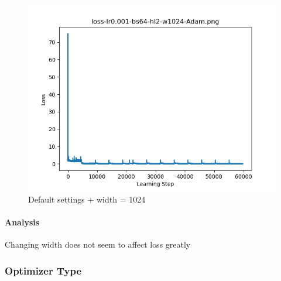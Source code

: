 \documentclass{article}[12pt]
\begin{document}
    \begin{figure}[H]
        \includegraphics[width=\linewidth]{testsResults/loss/w/loss-lr0.001-bs64-hl2-w1024-Adam.png}
        \caption{Default settings + width = 1024}
        \endminipage
    \end{figure}

    \paragraph{Analysis} Changing width does not seem to affect loss greatly


\subsubsection{Optimizer Type}
\end{document}
